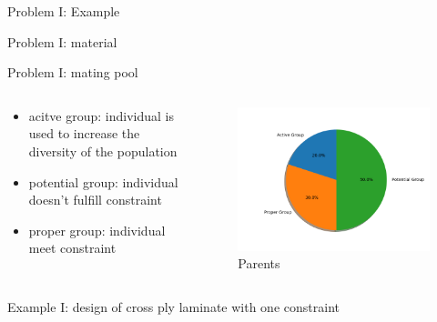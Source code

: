 \documentclass{beamer}
\begin{document}
\begin{frame}{Problem I: Example}
	
\end{frame}

\begin{frame}{Problem I: material}
	
\end{frame}

\begin{frame}{Problem I: mating pool}
    \begin{columns}[c]
    \begin{column}{0.5\textwidth}
		\begin{itemize}
			\item acitve group: individual is used to increase the diversity of the population
			\item potential group: individual doesn't fulfill constraint
			\item proper group: individual meet constraint
		\end{itemize}
    \end{column}
	\begin{column}{0.5\textwidth}
		\begin{figure}
			\caption{Parents}
			\includegraphics[scale=0.5]{fig/chapter2_figure_group_pie.png}
		\end{figure}
	\end{column}
\end{columns}
\end{frame}

\begin{frame}{Example I: design of cross ply laminate with one constraint}
	
\end{frame}
\end{document}
